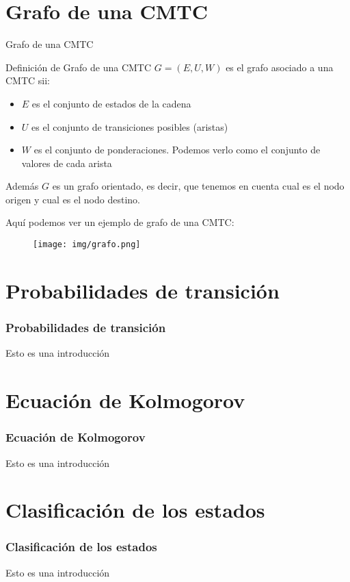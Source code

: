 \documentclass{beamer}
\begin{document}
\section{Grafo de una CMTC}
\begin{frame}{Grafo de una CMTC}
\begin{block}{Definición de Grafo de una CMTC}
$G=(E,U,W)$ es el grafo asociado a una CMTC sii:
\begin{itemize}
\item $E$ es el conjunto de estados de la cadena
\item $U$ es el conjunto de transiciones posibles (aristas)
\item $W$ es el conjunto de ponderaciones. Podemos verlo como el conjunto de valores de cada arista
\end{itemize}
Además $G$ es un grafo orientado, es decir, que tenemos en cuenta cual es el nodo origen y cual es el nodo destino.
\end{block}
\end{frame}
\begin{frame}
Aquí podemos ver un ejemplo de grafo de una CMTC:
\newline
\begin{figure}[h]
  \centering
    \texttt{[image: img/grafo.png]}
  \label{fig:ejemplo}
\end{figure}
\end{frame}
\section{Probabilidades de transición}
\begin{frame}
    \frametitle{Probabilidades de transición}
    Esto es una introducción
\end{frame}

\section{Ecuación de Kolmogorov}
\begin{frame}
    \frametitle{Ecuación de Kolmogorov}
    Esto es una introducción
\end{frame}

\section{Clasificación de los estados}
\begin{frame}
    \frametitle{Clasificación de los estados}
    Esto es una introducción
\end{frame}
\end{document}
